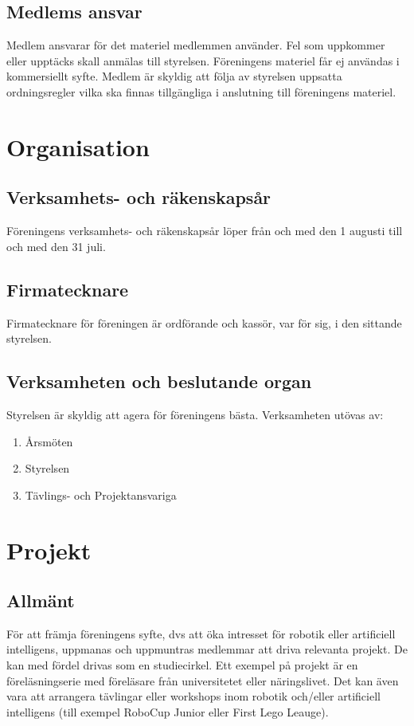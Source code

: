 \documentclass[11pt,a4paper]{article}
\begin{document}
\subsection{Medlems ansvar}
Medlem ansvarar för det materiel medlemmen använder. Fel som
uppkommer eller upptäcks skall anmälas till styrelsen.
Föreningens materiel får ej användas i kommersiellt syfte. Medlem är
skyldig att följa av styrelsen uppsatta ordningsregler vilka ska finnas
tillgängliga i anslutning till föreningens materiel.



\section{Organisation}

\subsection{Verksamhets- och räkenskapsår}
Föreningens verksamhets- och räkenskapsår löper från och med den 1
augusti till och med den 31 juli.
\subsection{Firmatecknare}
Firmatecknare för föreningen är ordförande och kassör, var för sig, i den
sittande styrelsen. 
\subsection{Verksamheten och beslutande organ}
Styrelsen är skyldig att agera för föreningens bästa. Verksamheten utövas av:
\begin{enumerate}
\item Årsmöten
\item Styrelsen
\item Tävlings- och Projektansvariga
\end{enumerate}


\section{Projekt}

\subsection{Allmänt}
För att främja föreningens syfte, dvs att öka intresset för robotik eller
artificiell intelligens, uppmanas och uppmuntras medlemmar att driva
relevanta projekt. De kan med fördel drivas som en studiecirkel. Ett
exempel på projekt är en föreläsningserie med föreläsare från universitetet
eller näringslivet. Det kan även vara att arrangera tävlingar eller
workshops inom robotik och/eller artificiell intelligens (till exempel
RoboCup Junior eller First Lego Leauge).
\end{document}
